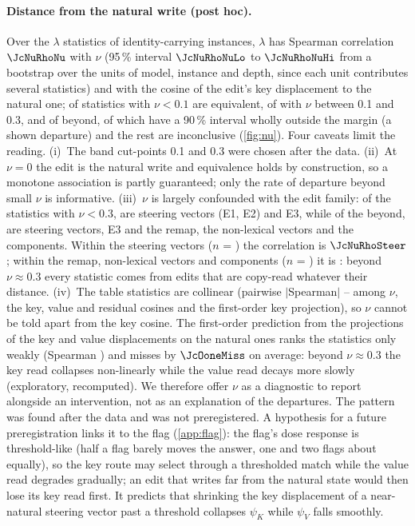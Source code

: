 \paragraph{Distance from the natural write (post hoc).} Over the \JcNuN{} $\lambda$ statistics of identity-carrying instances, $\lambda$ has Spearman correlation $\JcNuRhoNu$ with $\nu$ (95\,\% interval $\JcNuRhoNuLo$ to $\JcNuRhoNuHi$ from a bootstrap over the \JcNuUnits{} units of model, instance and depth, since each unit contributes several statistics) and \JcNuRhoCosK{} with the cosine of the edit's key displacement to the natural one; \JcNuEqLow{} of \JcNuNLow{} statistics with $\nu < 0.1$ are equivalent, \JcNuEqMid{} of \JcNuNMid{} with $\nu$ between 0.1 and 0.3, and \JcNuEqHigh{} of \JcNuNHigh{} beyond, of which \JcNuOutHigh{} have a 90\,\% interval wholly outside the margin (a shown departure) and the rest are inconclusive (\cref{fig:nu}). Four caveats limit the reading. (i)~The band cut-points 0.1 and 0.3 were chosen after the data. (ii)~At $\nu = 0$ the edit is the natural write and equivalence holds by construction, so a monotone association is partly guaranteed; only the rate of departure beyond small $\nu$ is informative. (iii)~$\nu$ is largely confounded with the edit family: of the \JcNuNBelow{} statistics with $\nu < 0.3$, \JcNuSteerBelow{} are steering vectors (E1, E2) and \JcNuEthreeBelow{} E3, while of the \JcNuNHigh{} beyond, \JcNuSteerAbove{} are steering vectors, \JcNuEthreeAbove{} E3 and \JcNuOtherAbove{} the remap, the non-lexical vectors and the components. Within the steering vectors ($n$ = \JcNuNSteer{}) the correlation is $\JcNuRhoSteer$; within the remap, non-lexical vectors and components ($n$ = \JcNuNOther{}) it is \JcNuRhoOther{}: beyond $\nu \approx 0.3$ every statistic comes from edits that are copy-read whatever their distance. (iv)~The table statistics are collinear (pairwise $\lvert$Spearman$\rvert$ \JcNuCollMin{}--\JcNuCollMax{} among $\nu$, the key, value and residual cosines and the first-order key projection), so $\nu$ cannot be told apart from the key cosine. The first-order prediction from the projections of the key and value displacements on the natural ones ranks the statistics only weakly (Spearman \JcOoneRho{}) and misses by $\JcOoneMiss$ on average: beyond $\nu \approx 0.3$ the key read collapses non-linearly while the value read decays more slowly (exploratory, recomputed). We therefore offer $\nu$ as a diagnostic to report alongside an intervention, not as an explanation of the departures. The pattern was found after the data and was not preregistered. A hypothesis for a future preregistration links it to the flag (\cref{app:flag}): the flag's dose response is threshold-like (half a flag barely moves the answer, one and two flags about equally), so the key route may select through a thresholded match while the value read degrades gradually; an edit that writes far from the natural state would then lose its key read first. It predicts that shrinking the key displacement of a near-natural steering vector past a threshold collapses $\psi_K$ while $\psi_V$ falls smoothly.

